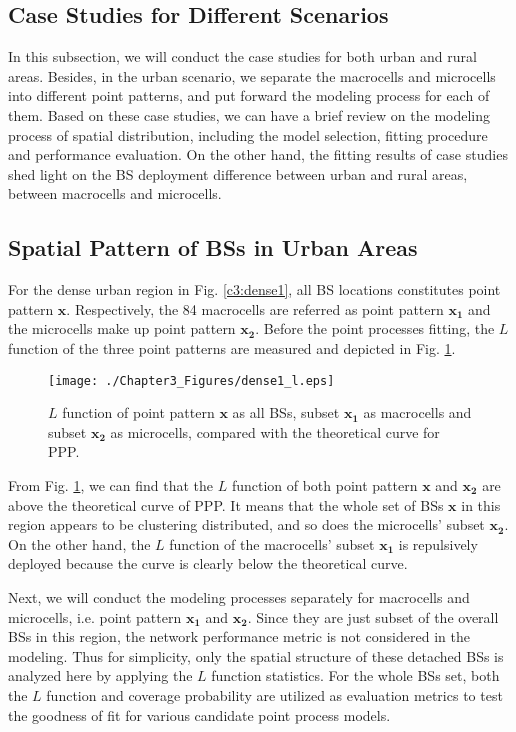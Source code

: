 \subsection{Case Studies for Different Scenarios}
In this subsection, we will conduct the case studies for both urban and rural areas. Besides, in the urban scenario, we separate the macrocells and microcells into different point patterns, and put forward the modeling process for each of them. Based on these case studies, we can have a brief review on the modeling process of spatial distribution, including the model selection, fitting procedure and performance evaluation. On the other hand, the fitting results of case studies shed light on the BS deployment difference between urban and rural areas, between macrocells and microcells.
\subsection*{Spatial Pattern of BSs in Urban Areas}
For the dense urban region in Fig. \ref{c3:dense1}, all BS locations constitutes point pattern $\mathbf{x}$. Respectively, the 84 macrocells are referred as point pattern $\mathbf{x_1}$ and the microcells make up point pattern $\mathbf{x_2}$. Before the point processes fitting, the $L$ function of the three point patterns are measured and depicted in Fig. \ref{fig:dense1l}.

\begin{figure}[!htb]
\centering
\texttt{[image: ./Chapter3\_Figures/dense1\_l.eps]}
\centering
\caption{$L$ function of point pattern $\mathbf{x}$ as all BSs, subset $\mathbf{x_1}$ as macrocells and subset $\mathbf{x_2}$ as microcells, compared with the theoretical curve for PPP.}
\label{fig:dense1l}
\end{figure}

From Fig. \ref{fig:dense1l}, we can find that the $L$ function of both point pattern $\mathbf{x}$ and $\mathbf{x_2}$ are above the theoretical curve of PPP. It means that the whole set of BSs $\mathbf{x}$ in this region appears to be clustering distributed, and so does the microcells' subset $\mathbf{x_2}$. On the other hand, the $L$ function of the macrocells' subset $\mathbf{x_1}$ is repulsively deployed because the curve is clearly below the theoretical curve.

Next, we will conduct the modeling processes separately for macrocells and microcells, i.e. point pattern $\mathbf{x_1}$ and $\mathbf{x_2}$. Since they are just subset of the overall BSs in this region, the network performance metric is not considered in the modeling. Thus for simplicity, only the spatial structure of these detached BSs is analyzed here by applying the $L$ function statistics. For the whole BSs set, both the $L$ function and coverage probability are utilized as evaluation metrics to test the goodness of fit for various candidate point process models.

